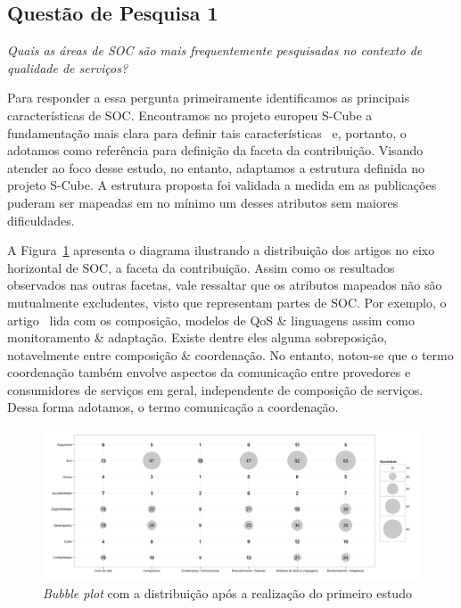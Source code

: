 \subsection{Quest\~{a}o de Pesquisa 1}
\emph{Quais as áreas de SOC são mais frequentemente pesquisadas no contexto de qualidade de serviços?}


Para responder a essa pergunta primeiramente identificamos as principais caracter\'{i}sticas de SOC. Encontramos no projeto europeu S-Cube a fundamenta\c{c}\~{a}o mais clara para definir tais caracter\'{i}sticas~\cite{SCube-FINALREPORT} e, portanto, o adotamos como refer\^{e}ncia para definição da faceta da contribui\c{c}\~{a}o. Visando atender ao foco desse estudo, no entanto, adaptamos a estrutura definida no projeto S-Cube. A estrutura proposta foi validada a medida em as publicações puderam ser mapeadas em no mínimo um desses atributos sem maiores dificuldades.


A Figura~\ref{fig:bubbleplot-QoSSOC} apresenta o diagrama ilustrando a distribui\c{c}\~{a}o dos artigos no eixo horizontal de SOC, a faceta da contribui\c{c}\~{a}o. Assim como os resultados observados nas outras facetas, vale ressaltar que os atributos mapeados não são mutualmente excludentes, visto que representam partes de SOC. Por exemplo, o artigo~\cite{DBLP:conf/dsn/ZhengL09} lida com os composi\c{c}\~{a}o, modelos de QoS \& linguagens assim como monitoramento \& adapta\c{c}\~{a}o. Existe dentre eles alguma sobreposição, notavelmente entre composição \& coordenação. No entanto, notou-se que o termo coordenação também envolve aspectos da comunicação entre provedores e consumidores de serviços em geral, independente de composição de serviços. Dessa forma adotamos, o termo comunicação a coordena\c{c}\~{a}o.

\begin{figure}[htb]
\centering
\includegraphics[scale=0.4]{imagens/contribuicaoContexto.pdf}
\caption{\emph{Bubble plot} com a distribui\c{c}\~{a}o ap\'{o}s a realiza\c{c}\~{a}o do primeiro  estudo}
\label{fig:bubbleplot-QoSSOC}
\end{figure}

